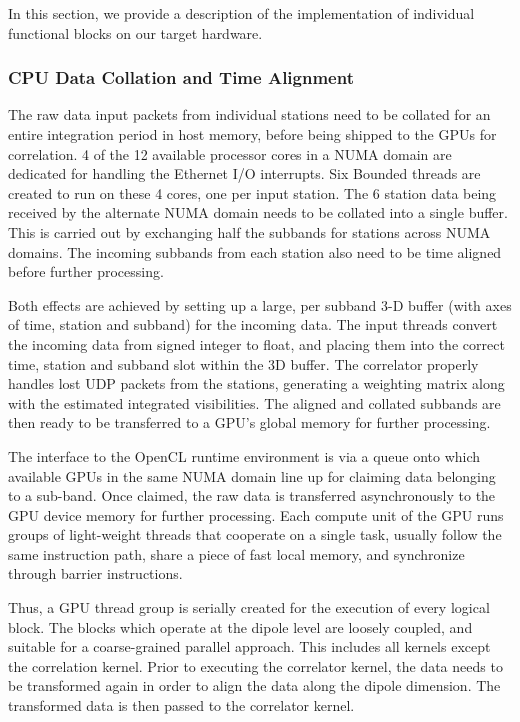 \documentclass{ws-jai}
\begin{document}
In this  section, we provide a  description of the implementation  of individual
functional blocks on our target hardware.\\

\subsubsection  {CPU Data Collation and  Time Alignment}
 The raw  data input
packets from individual  stations need to be collated for  an entire integration
period in host memory,  before being shipped to the GPUs  for correlation.  4 of
the  12  available processor  cores  in  a NUMA  domain  are dedicated for handling the 
 Ethernet I/O interrupts.  Six Bounded threads
are created to run  on these 4 cores, one per input station.  The 6 station data
being received by the  alternate NUMA domain needs to be  collated into a single
buffer. This is carried out by  exchanging half the subbands for stations across
NUMA domains.   The incoming  subbands from  each station also  need to  be time
aligned before further processing.

Both effects are  achieved by setting up  a large, per subband  3-D buffer (with
axes of  time, station  and subband)  for the incoming  data. The  input threads
convert the  incoming data from signed  integer to float, and  placing them into
the correct time, station and subband slot within the 3D buffer.  The correlator
properly  handles lost  UDP packets  from the  stations, generating  a weighting
matrix  along  with the  estimated  integrated  visibilities.  The  aligned  and
collated subbands are then ready to be  transferred to a GPU's global memory for
further processing.

The  interface to  the OpenCL  runtime  environment is  via a  queue onto  which
available GPUs in the same NUMA domain  line up for claiming data belonging to a
sub-band.  Once claimed,  the raw data is transferred asynchronously  to the GPU
device memory for  further processing. Each compute unit of  the GPU runs groups
of light-weight threads that cooperate on a single task, usually follow the same
instruction path,  share a piece of  fast local memory, and  synchronize through
barrier instructions.

Thus, a GPU thread group is serially  created for the execution of every logical
block.  The  blocks which operate at  the dipole level are  loosely coupled, and
suitable  for a  coarse-grained parallel  approach.  This  includes all  kernels
except the  correlation kernel.  Prior to executing  the correlator  kernel, the
data needs to be  transformed again in order to align the  data along the dipole
dimension. The transformed data is then passed to the correlator kernel.
\end{document}
